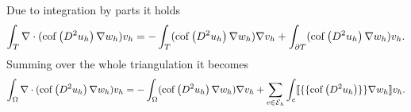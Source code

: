 Due to integration by parts it holds
\begin{align*}
  \int_T \nabla \cdot (\operatorname{cof} \left( D^2 u_h \right) \nabla w_h) v_h= -\int_T (\operatorname{cof} \left( D^2 u_h \right) \nabla w_h) \nabla v_h+ \int_{\partial T} (\operatorname{cof} \left( D^2 u_h \right) \nabla w_h) v_h.
\end{align*}
Summing over the whole triangulation it becomes
\begin{align*}
  \int_\Omega \nabla \cdot (\operatorname{cof} \left( D^2 u_h \right) \nabla w_h) v_h= -\int_\Omega (\operatorname{cof} \left( D^2 u_h \right) \nabla w_h) \nabla v_h+ \sum_{e \in \mathcal{E}_h} \int_{e} \llbracket \{\{\operatorname{cof} \left( D^2 u_h \right) \}\} \nabla w_h\rrbracket v_h.
\end{align*}

